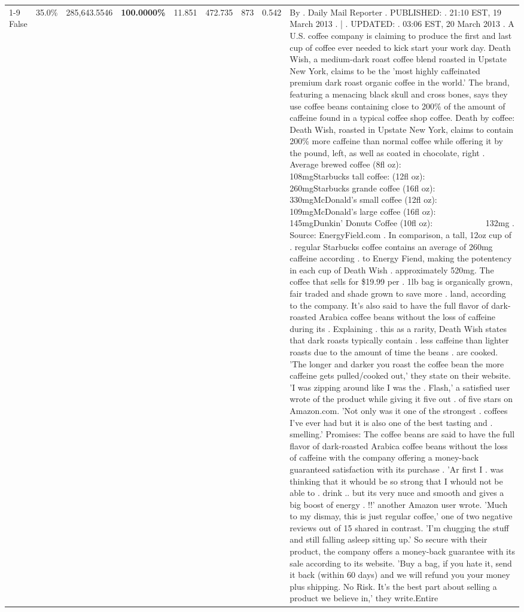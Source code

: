 \begin{table}[H]
{\begin{tabular}{lllrlllll}
\cline{1-9}
False & 35.0\% & 285,643.5546 & \bfseries \color{red} 100.0000\% & 11.851 & 472.735 & 873 & 0.542 & By . Daily Mail Reporter . PUBLISHED: . 21:10 EST, 19 March 2013 . | . UPDATED: . 03:06 EST, 20 March 2013 . A U.S. coffee company is claiming to produce the first and last cup of coffee ever needed to kick start your work day. Death Wish, a medium-dark roast coffee blend roasted in Upstate New York, claims to be the 'most highly caffeinated premium dark roast organic coffee in the world.' The brand, featuring a menacing black skull and cross bones, says they use coffee beans containing close to 200\% of the amount of caffeine found in a typical coffee shop coffee. Death by coffee: Death Wish, roasted in Upstate New York, claims to contain 200\% more caffeine than normal coffee while offering it by the pound, left, as well as coated in chocolate, right . Average brewed coffee (8fl oz):              108mgStarbucks tall coffee: (12fl oz):                260mgStarbucks grande coffee (16fl oz):         330mgMcDonald's small coffee (12fl oz):           109mgMcDonald's large coffee (16fl oz):           145mgDunkin' Donuts Coffee (10fl oz):             132mg . Source: EnergyField.com . In comparison, a tall, 12oz cup of . regular Starbucks coffee contains an average of 260mg caffeine according . to Energy Fiend, making the potentency in each cup of Death Wish . approximately 520mg. The coffee that sells for \$19.99 per . 1lb bag is organically grown, fair traded and shade grown to save more . land, according to the company. It's also said to have the full flavor of dark-roasted Arabica coffee beans without the loss of caffeine during its . Explaining . this as a rarity, Death Wish states that dark roasts typically contain . less caffeine than lighter roasts due to the amount of time the beans . are cooked. 'The longer and darker you roast the coffee bean the more caffeine gets pulled/cooked out,' they state on their website. 'I was zipping around like I was the . Flash,' a satisfied user wrote of the product while giving it five out . of five stars on Amazon.com. 'Not only was it one of the strongest . coffees I've ever had but it is also one of the best tasting and . smelling.’ Promises: The coffee beans are said to have the full flavor of dark-roasted Arabica coffee beans without the loss of caffeine with the company offering a money-back guaranteed satisfaction with its purchase . 'Ar first I . was thinking that it whould be so strong that I whould not be able to . drink .. but its very nuce and smooth and gives a big boost of energy . !!' another Amazon user wrote. 'Much to my dismay, this is just regular coffee,' one of two negative reviews out of 15 shared in contrast. 'I'm chugging the stuff and still falling asleep sitting up.' So secure with their product, the company offers a money-back guarantee with its sale according to its website. 'Buy a bag, if you hate it, send it back (within 60 days) and we will refund you your money plus shipping. No Risk. It’s the best part about selling a product we believe in,' they write.Entire \\

\end{tabular}}
\end{table}
